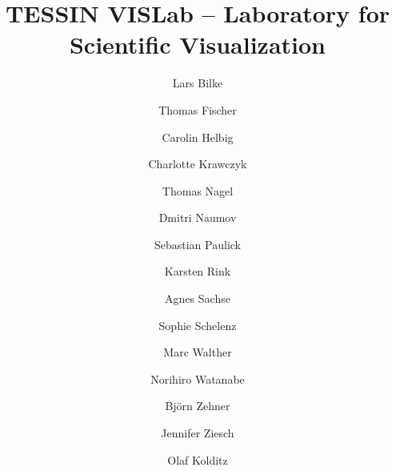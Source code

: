 \documentclass[twocolumn]{svjour3}          %
\begin{document}
\title{TESSIN VISLab -- Laboratory for Scientific Visualization%
}




\author{Lars Bilke         \and
        Thomas Fischer     \and
        Carolin Helbig     \and
        Charlotte Krawczyk \and
        Thomas Nagel       \and
        Dmitri Naumov      \and
        Sebastian Paulick  \and
        Karsten Rink       \and
        Agnes Sachse       \and
        Sophie Schelenz    \and
        Marc Walther       \and
        Norihiro Watanabe  \and
        Bj\"orn Zehner     \and
        Jennifer Ziesch    \and
        Olaf Kolditz
}

\end{document}
